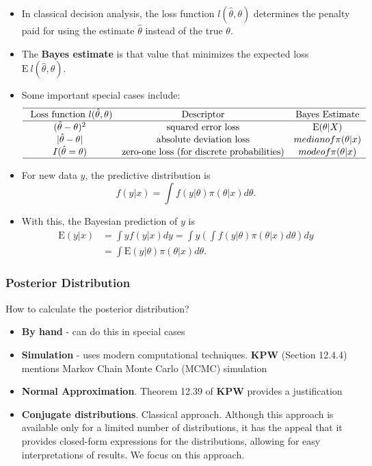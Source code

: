 \documentclass[]{book}
\begin{document}
\begin{itemize}
\item
  In classical decision analysis, the loss function
  \(l(\hat{\theta}, \theta)\) determines the penalty paid for using the
  estimate \(\hat{\theta}\) instead of the true \(\theta\).
\item
  The \textbf{Bayes estimate} is that value that minimizes the expected
  loss \(\mathrm{E~}l(\hat{\theta}, \theta)\).
\item
  Some important special cases include: \[\begin{array}{ccc}  \hline
  \text{ Loss function } l(\hat{\theta}, \theta) & \text{Descriptor} & \text{Bayes Estimate}\\ \hline
  (\hat{\theta}- \theta)^2 & \text{squared error loss} & \mathrm{E}(\theta|X)  \\
  |\hat{\theta}- \theta| & \text{absolute deviation loss} & median of \pi(\theta|x)\\
  I(\hat{\theta} =\theta) & \text{zero-one loss (for discrete probabilities)}& mode of \pi(\theta|x) \\  \hline
  \end{array}\]
\item
  For new data \(y\), the predictive distribution is
  \[f(y|x) = \int f(y|\theta) \pi(\theta|x) d\theta .\]
\item
  With this, the Bayesian prediction of \(y\) is \[\begin{aligned}
  \mathrm{E}(y|x) &= \int y f(y|x) dy = \int y \left(\int f(y|\theta) \pi(\theta|x) d\theta \right) dy \\
  &= \int  \mathrm{E}(y|\theta) \pi(\theta|x) d\theta .\end{aligned}\]
\end{itemize}

\subsubsection{Posterior Distribution}\label{posterior-distribution}

How to calculate the posterior distribution?

\begin{itemize}
\item
  \textbf{By hand} - can do this in special cases
\item
  \textbf{Simulation} - uses modern computational techniques.
  \textbf{KPW} (Section 12.4.4) mentions Markov Chain Monte Carlo (MCMC)
  simulation
\item
  \textbf{Normal Approximation}. Theorem 12.39 of \textbf{KPW} provides
  a justification
\item
  \textbf{Conjugate distributions}. Classical approach. Although this
  approach is available only for a limited number of distributions, it
  has the appeal that it provides closed-form expressions for the
  distributions, allowing for easy interpretations of results. We focus
  on this approach.
\end{itemize}
\end{document}
